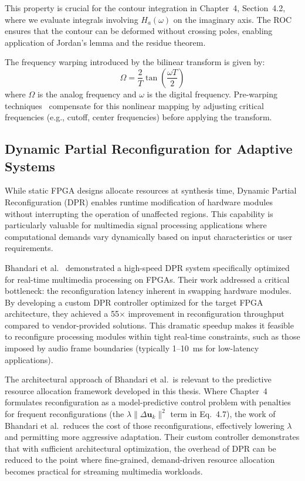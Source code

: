 This property is crucial for the contour integration in Chapter~4, Section~4.2, where we evaluate integrals involving $H_a(\omega)$ on the imaginary axis. The ROC ensures that the contour can be deformed without crossing poles, enabling application of Jordan's lemma and the residue theorem.

The frequency warping introduced by the bilinear transform is given by:
\[
\Omega = \frac{2}{T}\tan\left(\frac{\omega T}{2}\right)
\]
where $\Omega$ is the analog frequency and $\omega$ is the digital frequency. Pre-warping techniques~\cite{OppenheimDSP} compensate for this nonlinear mapping by adjusting critical frequencies (e.g., cutoff, center frequencies) before applying the transform.

\subsection{Dynamic Partial Reconfiguration for Adaptive Systems}

While static FPGA designs allocate resources at synthesis time, Dynamic Partial Reconfiguration (DPR) enables runtime modification of hardware modules without interrupting the operation of unaffected regions. This capability is particularly valuable for multimedia signal processing applications where computational demands vary dynamically based on input characteristics or user requirements.

Bhandari et al.~\cite{Bhandari2012} demonstrated a high-speed DPR system specifically optimized for real-time multimedia processing on FPGAs. Their work addressed a critical bottleneck: the reconfiguration latency inherent in swapping hardware modules. By developing a custom DPR controller optimized for the target FPGA architecture, they achieved a 55$\times$ improvement in reconfiguration throughput compared to vendor-provided solutions. This dramatic speedup makes it feasible to reconfigure processing modules within tight real-time constraints, such as those imposed by audio frame boundaries (typically 1--10~ms for low-latency applications).

The architectural approach of Bhandari et al.\ is relevant to the predictive resource allocation framework developed in this thesis. Where Chapter~4 formulates reconfiguration as a model-predictive control problem with penalties for frequent reconfigurations (the $\lambda \|\Delta \mathbf{u}_k\|^2$ term in Eq.~4.7), the work of Bhandari et al.\ reduces the cost of those reconfigurations, effectively lowering $\lambda$ and permitting more aggressive adaptation. Their custom controller demonstrates that with sufficient architectural optimization, the overhead of DPR can be reduced to the point where fine-grained, demand-driven resource allocation becomes practical for streaming multimedia workloads.

